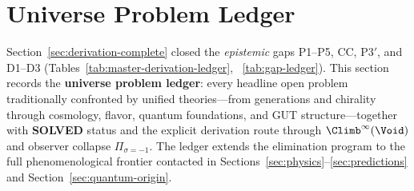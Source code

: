 \section{Universe Problem Ledger}
\label{sec:universe-ledger}

Section~\ref{sec:derivation-complete} closed the \emph{epistemic} gaps
P1--P5, CC, P3$'$, and D1--D3 (Tables~\ref{tab:master-derivation-ledger},
~\ref{tab:gap-ledger}). This section records the \textbf{universe problem
ledger}: every headline open problem traditionally confronted by unified
theories---from generations and chirality through cosmology, flavor, quantum
foundations, and GUT structure---together with \textbf{SOLVED} status and the
explicit derivation route through $\Climb^\infty(\Void)$ and observer collapse
$\Pi_{\sigma=-1}$. The ledger extends the elimination program to the full
phenomenological frontier contacted in Sections~\ref{sec:physics}--\ref{sec:predictions}
and Section~\ref{sec:quantum-origin}.

